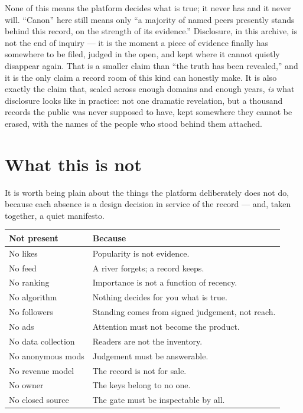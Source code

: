 \documentclass[11pt,a4paper]{article}
\begin{document}
None of this means the platform decides what is true; it never has and
it never will. ``Canon'' here still means only ``a majority of named
peers presently stands behind this record, on the strength of its
evidence.'' Disclosure, in this archive, is not the end of inquiry ---
it is the moment a piece of evidence finally has somewhere to be filed,
judged in the open, and kept where it cannot quietly disappear again.
That is a smaller claim than ``the truth has been revealed,'' and it is
the only claim a record room of this kind can honestly make. It is also
exactly the claim that, scaled across enough domains and enough years,
\emph{is} what disclosure looks like in practice: not one dramatic
revelation, but a thousand records the public was never supposed to
have, kept somewhere they cannot be erased, with the names of the
people who stood behind them attached.

\section{What this is not}

It is worth being plain about the things the platform deliberately does not
do, because each absence is a design decision in service of the record ---
and, taken together, a quiet manifesto.

\begin{center}
\begin{tabular}{@{}ll@{}}
\toprule
\textbf{Not present} & \textbf{Because} \\
\midrule
No likes            & Popularity is not evidence. \\
No feed             & A river forgets; a record keeps. \\
No ranking          & Importance is not a function of recency. \\
No algorithm        & Nothing decides for you what is true. \\
No followers        & Standing comes from signed judgement, not reach. \\
No ads              & Attention must not become the product. \\
No data collection  & Readers are not the inventory. \\
No anonymous mods   & Judgement must be answerable. \\
No revenue model    & The record is not for sale. \\
No owner            & The keys belong to no one. \\
No closed source    & The gate must be inspectable by all. \\
\bottomrule
\end{tabular}
\end{center}
\end{document}
